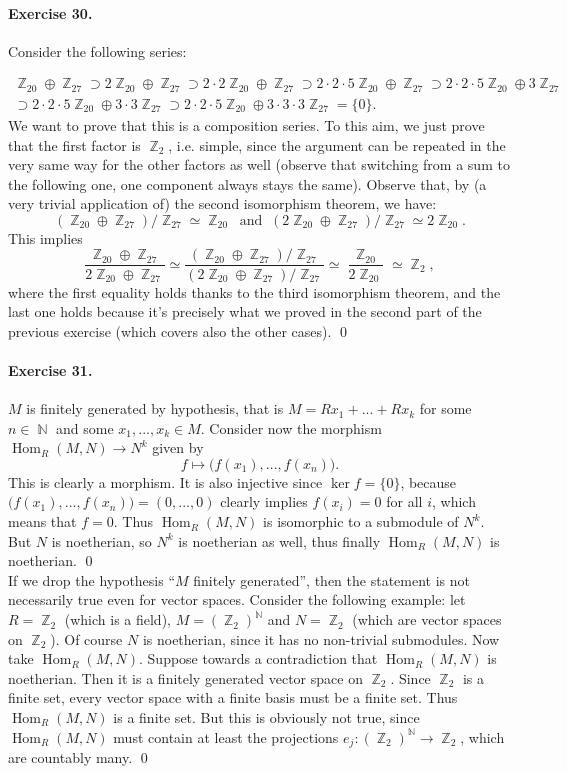 \documentclass[12pt,a4paper]{report}
\theoremstyle{definition}
\theoremstyle{num.custom-title}
\DeclareMathOperator{\Hom}{Hom}
\DeclareMathOperator{\N}{\mathbb{N}}
\DeclareMathOperator{\Z}{\mathbb{Z}}
\begin{document}
\paragraph{Exercise 30.} Consider the following series:

\begin{multline*}
\Z_{20} \oplus \Z_{27} \supset 2\Z_{20} \oplus \Z_{27} \supset 2 \cdot 2\Z_{20} \oplus \Z_{27} \supset 2 \cdot 2 \cdot 5 \Z_{20} \oplus \Z_{27} \supset 2 \cdot 2 \cdot 5 \Z_{20} \oplus 3 \Z_{27} \\
\supset 2 \cdot 2 \cdot 5 \Z_{20} \oplus 3 \cdot 3 \Z_{27} \supset 2 \cdot 2 \cdot 5 \Z_{20} \oplus 3 \cdot 3 \cdot 3 \Z_{27} = \{0\}.
\end{multline*}
We want to prove that this is a composition series. To this aim, we just prove that the first factor is $\Z_2$, i.e. simple, since the argument can be repeated in the very same way for the other factors as well (observe that switching from a sum to the following one, one component always stays the same). Observe that, by (a very trivial application of) the second isomorphism theorem, we have:
\[
(\Z_{20} \oplus \Z_{27}) / \Z_{27} \simeq \Z_{20} \ \text{ and } \ (2\Z_{20} \oplus \Z_{27}) / \Z_{27} \simeq 2\Z_{20}.
\]
This implies
\[
\frac{\Z_{20} \oplus \Z_{27}}{2\Z_{20} \oplus \Z_{27}} \simeq \frac{(\Z_{20} \oplus \Z_{27}) / \Z_{27}}{(2\Z_{20} \oplus \Z_{27}) / \Z_{27}} \simeq \frac{\Z_{20}}{2\Z_{20}} \simeq \Z_2,
\]
where the first equality holds thanks to the third isomorphism theorem, and the last one holds because it's precisely what we proved in the second part of the previous exercise (which covers also the other cases). \qed

\paragraph{Exercise 31.} $M$ is finitely generated by hypothesis, that is $M=Rx_1+...+Rx_k$ for some $n \in \N$ and some $x_1,...,x_k \in M$. Consider now the morphism $\Hom_R(M,N) \to N^k$ given by
\[
f \mapsto \big( f(x_1),...,f(x_n) \big).
\]
This is clearly a morphism. It is also injective since $\ker f = \{0\}$, because $\big( f(x_1),...,f(x_n) \big) = (0,...,0)$ clearly implies $f(x_i)=0$ for all $i$, which means that $f=0$. Thus $\Hom_R(M,N)$ is isomorphic to a submodule of $N^k$. But $N$ is noetherian, so $N^k$ is noetherian as well, thus finally $\Hom_R(M,N)$ is noetherian. \qed \\
If we drop the hypothesis ``$M$ finitely generated'', then the statement is not necessarily true even for vector spaces. Consider the following example: let $R=\Z_2$ (which is a field), $M= (\Z_2)^{\N}$ and $N=\Z_2$ (which are vector spaces on $\Z_2$). Of course $N$ is noetherian, since it has no non-trivial submodules. Now take $\Hom_R(M,N)$. Suppose towards a contradiction that $\Hom_R(M,N)$ is noetherian. Then it is a finitely generated vector space on $\Z_2$. Since $\Z_2$ is a finite set, every vector space with a finite basis must be a finite set. Thus $\Hom_R(M,N)$ is a finite set. But this is obviously not true, since $\Hom_R(M,N)$ must contain at least the projections $e_j : (\Z_2)^{\N} \to \Z_2$, which are countably many. \qed
\end{document}
